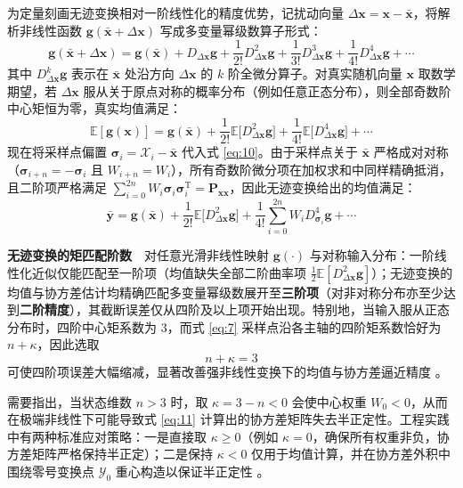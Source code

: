 为定量刻画无迹变换相对一阶线性化的精度优势，记扰动向量 $\Delta\bm{x} = \bm{x} - \bar{\bm{x}}$，将解析非线性函数 $\bm{g}(\bar{\bm{x}} + \Delta\bm{x})$ 写成多变量幂级数算子形式：
\begin{equation}\label{eq:13}
\bm{g}(\bar{\bm{x}} + \Delta\bm{x}) = \bm{g}(\bar{\bm{x}}) + D_{\Delta\bm{x}}\bm{g} + \frac{1}{2!} D_{\Delta\bm{x}}^2 \bm{g} + \frac{1}{3!} D_{\Delta\bm{x}}^3 \bm{g} + \frac{1}{4!} D_{\Delta\bm{x}}^4 \bm{g} + \cdots
\end{equation}
其中 $D_{\Delta\bm{x}}^k \bm{g}$ 表示在 $\bar{\bm{x}}$ 处沿方向 $\Delta\bm{x}$ 的 $k$ 阶全微分算子。对真实随机向量 $\bm{x}$ 取数学期望，若 $\Delta\bm{x}$ 服从关于原点对称的概率分布（例如任意正态分布），则全部奇数阶中心矩恒为零，真实均值满足：
\begin{equation}\label{eq:14}
\mathbb{E}[\bm{g}(\bm{x})] = \bm{g}(\bar{\bm{x}}) + \frac{1}{2!} \mathbb{E}\bigl[D_{\Delta\bm{x}}^2 \bm{g}\bigr] + \frac{1}{4!} \mathbb{E}\bigl[D_{\Delta\bm{x}}^4 \bm{g}\bigr] + \cdots
\end{equation}
现在将采样点偏置 $\bm{\sigma}_i = \mathcal{X}_i - \bar{\bm{x}}$ 代入式 \eqref{eq:10}。由于采样点关于 $\bar{\bm{x}}$ 严格成对对称（$\bm{\sigma}_{i+n} = -\bm{\sigma}_i$ 且 $W_{i+n} = W_i$），所有奇数阶微分项在加权求和中同样精确抵消，且二阶项严格满足 $\sum_{i=0}^{2n} W_i \bm{\sigma}_i \bm{\sigma}_i^{\mathrm{T}} = \bm{P}_{\bm{x}\bm{x}}$，因此无迹变换给出的均值满足：
\begin{equation}\label{eq:15}
\bar{\bm{y}} = \bm{g}(\bar{\bm{x}}) + \frac{1}{2!} \mathbb{E}\bigl[D_{\Delta\bm{x}}^2 \bm{g}\bigr] + \frac{1}{4!} \sum_{i=0}^{2n} W_i D_{\bm{\sigma}_i}^4 \bm{g} + \cdots
\end{equation}

\begin{proposition}\label{prop:ut-order}
\textbf{无迹变换的矩匹配阶数}　对任意光滑非线性映射 $\bm{g}(\cdot)$ 与对称输入分布：一阶线性化近似仅能匹配至一阶项（均值缺失全部二阶曲率项 $\frac{1}{2}\mathbb{E}[D_{\Delta\bm{x}}^2\bm{g}]$）；无迹变换的均值与协方差估计均精确匹配多变量幂级数展开至\textbf{三阶项}（对非对称分布亦至少达到\textbf{二阶精度}），其截断误差仅从四阶及以上项开始出现。特别地，当输入服从正态分布时，四阶中心矩系数为 $3$，而式 \eqref{eq:7} 采样点沿各主轴的四阶矩系数恰好为 $n + \kappa$，因此选取
\begin{equation}\label{eq:16}
n + \kappa = 3
\end{equation}
可使四阶项误差大幅缩减，显著改善强非线性变换下的均值与协方差逼近精度 \cite{r08}。

\end{proposition}

需要指出，当状态维数 $n > 3$ 时，取 $\kappa = 3 - n < 0$ 会使中心权重 $W_0 < 0$，从而在极端非线性下可能导致式 \eqref{eq:11} 计算出的协方差矩阵失去半正定性。工程实践中有两种标准应对策略：一是直接取 $\kappa \ge 0$（例如 $\kappa = 0$，确保所有权重非负，协方差矩阵严格保持半正定）；二是保持 $\kappa < 0$ 仅用于均值计算，并在协方差外积中围绕零号变换点 $\mathcal{Y}_0$ 重心构造以保证半正定性 \cite{r08}。
